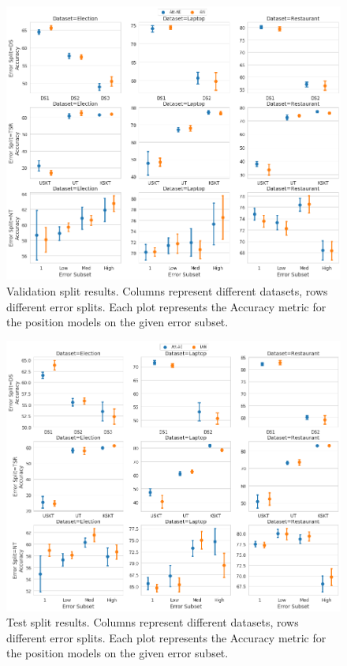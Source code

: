 \begin{figure}[h!]
    \centering
    \includegraphics[scale=0.32]{images/augmentation/methods_performance/Position_Encoding/position_split_overall_validation_results.png}
    \caption{Validation split results. Columns represent different datasets, rows different error splits. Each plot represents the Accuracy metric for the position models on the given error subset.}
    \label{fig:aug_position_split_overall_validation_results}
\end{figure}

\begin{figure}[h!]
    \centering
    \includegraphics[scale=0.32]{images/augmentation/methods_performance/Position_Encoding/position_split_overall_test_results.png}
    \caption{Test split results. Columns represent different datasets, rows different error splits. Each plot represents the Accuracy metric for the position models on the given error subset.}
    \label{fig:aug_position_split_overall_test_results}
\end{figure}

